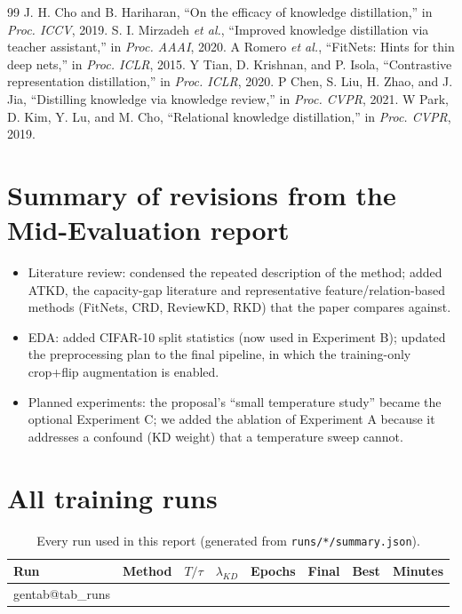 \documentclass[12pt,a4paper]{article}
\makeatletter
\newcommand{\gentable}[2]{\csname gentab@#1\endcsname}
\makeatother
\begin{document}
\begin{thebibliography}{99}
 J. H. Cho and B. Hariharan, ``On the efficacy of knowledge distillation,'' in \textit{Proc. ICCV}, 2019.
 S. I. Mirzadeh \textit{et al.}, ``Improved knowledge distillation via teacher assistant,'' in \textit{Proc. AAAI}, 2020.
 A Romero \textit{et al.}, ``FitNets: Hints for thin deep nets,'' in \textit{Proc. ICLR}, 2015.
 Y Tian, D. Krishnan, and P. Isola, ``Contrastive representation distillation,'' in \textit{Proc. ICLR}, 2020.
 P Chen, S. Liu, H. Zhao, and J. Jia, ``Distilling knowledge via knowledge review,'' in \textit{Proc. CVPR}, 2021.
 W Park, D. Kim, Y. Lu, and M. Cho, ``Relational knowledge distillation,'' in \textit{Proc. CVPR}, 2019.
\end{thebibliography}

\appendix
\section{Summary of revisions from the Mid-Evaluation report}
\label{app:revisions}
\begin{itemize}[nosep]
\item Literature review: condensed the repeated description of the method; added ATKD, the capacity-gap literature and representative feature/relation-based methods (FitNets, CRD, ReviewKD, RKD) that the paper compares against.
\item EDA: added CIFAR-10 split statistics (now used in Experiment B); updated the preprocessing plan to the final pipeline, in which the training-only crop+flip augmentation is enabled.
\item Planned experiments: the proposal's ``small temperature study'' became the optional Experiment C; we added the ablation of Experiment A because it addresses a confound (KD weight) that a temperature sweep cannot.
\end{itemize}

\section{All training runs}
\begin{table}[H]
\centering
\caption{Every run used in this report (generated from \texttt{runs/*/summary.json}).}
\small
\begin{tabular}{llcccccc}
\toprule
Run & Method & $T/\tau$ & $\lambda_{KD}$ & Epochs & Final & Best & Minutes \\
\midrule
\gentable{tab_runs}{8}
\bottomrule
\end{tabular}
\end{table}
\end{document}

